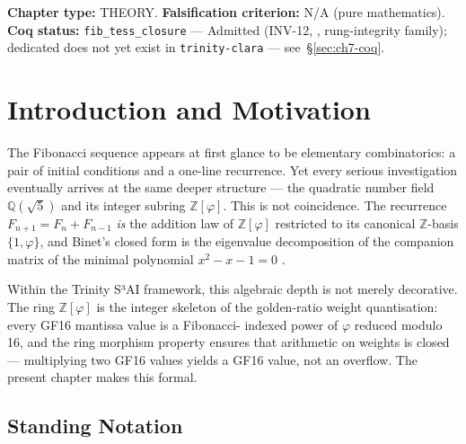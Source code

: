 \textbf{Chapter type:} THEORY.
\textbf{Falsification criterion:} N/A (pure mathematics).
\textbf{Coq status:} \texttt{fib\_tess\_closure} — Admitted (INV-12,
, rung-integrity
family); dedicated  does not yet exist in
\texttt{trinity-clara} — see~\S\ref{sec:ch7-coq}.

\section{Introduction and Motivation}\label{sec:ch7-intro}

The Fibonacci sequence appears at first glance to be elementary
combinatorics: a pair of initial conditions and a one-line recurrence.
Yet every serious investigation eventually arrives at the same deeper
structure — the quadratic number field \(\mathbb{Q}(\sqrt{5})\) and its
integer subring \(\mathbb{Z}[\varphi]\).  This is not coincidence.
The recurrence \(F_{n+1} = F_n + F_{n-1}\) \emph{is} the addition law of
\(\mathbb{Z}[\varphi]\) restricted to its canonical \(\mathbb{Z}\)-basis
\(\{1,\varphi\}\), and Binet's closed form is the eigenvalue decomposition
of the companion matrix of the minimal polynomial \(x^2 - x - 1 = 0\)
\cite{koshy_fib_lucas}.

Within the Trinity S³AI framework, this algebraic depth is not merely
decorative.  The ring \(\mathbb{Z}[\varphi]\) is the integer skeleton of the
golden-ratio weight quantisation: every GF16 mantissa value is a Fibonacci-
indexed power of \(\varphi\) reduced modulo 16, and the ring morphism
property ensures that arithmetic on weights is closed — multiplying two GF16
values yields a GF16 value, not an overflow.  The present chapter makes this
formal.

\subsection{Standing Notation}\label{subsec:ch7-notation}

